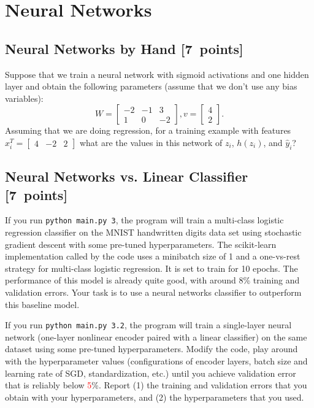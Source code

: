 \documentclass{article}
\newcommand{\blu}[1]{{\textcolor{blu}{#1}}}
\newcommand{\red}[1]{\textcolor{red}{#1}}
\let\ask\blu
\newcommand\pts[1]{\textcolor{pointscolour}{[#1~points]}}
\newcommand{\mat}[1]{\begin{bmatrix}#1\end{bmatrix}}
\begin{document}
\section{Neural Networks}

\subsection{Neural Networks by Hand \pts{7}}

Suppose that we train a neural network with sigmoid activations and one hidden layer and obtain the following parameters (assume that we don't use any bias variables):
\[
W = \mat{-2 & -1 & 3\\1 & 0 & -2}, v = \mat{4 \\2}.
\]
Assuming that we are doing regression, \ask{for a training example with features $x_i^T = \mat{4 &-2 & 2}$ what are the values in this network of $z_i$, $h(z_i)$, and $\hat{y}_i$?}


\subsection{Neural Networks vs. Linear Classifier \pts{7}}


If you run \texttt{python main.py 3}, the program will train a multi-class logistic regression classifier on the MNIST handwritten digits data set using stochastic gradient descent with some pre-tuned hyperparameters.
The scikit-learn implementation called by the code uses a minibatch size of 1 and a one-vs-rest strategy for multi-class logistic regression. It is set to train for 10 epochs.
The performance of this model is already quite good, with around 8\% training and validation errors. Your task is to use a neural networks classifier to outperform this baseline model.

If you run \texttt{python main.py 3.2}, the program will train a single-layer neural network (one-layer nonlinear encoder paired with a linear classifier) on the same dataset using some pre-tuned hyperparameters. Modify the code, play around with the hyperparameter values (configurations of encoder layers, batch size and learning rate of SGD, standardization, etc.) until you achieve validation error that is reliably below \red{5}\%. \ask{Report (1) the training and validation errors that you obtain with your hyperparameters, and (2) the hyperparameters that you used.}
\end{document}
